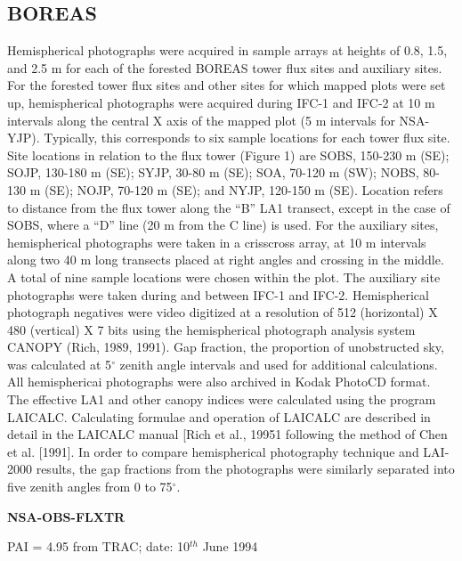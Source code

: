 \documentclass[a4paper,11pt]{report}
\begin{document}
\subsection{BOREAS}
Hemispherical photographs were acquired in sample arrays at heights of 0.8, 1.5, and 2.5 m for each of the forested BOREAS tower flux sites and auxiliary sites. For the forested tower flux sites and other sites for which mapped plots were set up, hemispherical photographs were acquired during IFC-1 and IFC-2 at 10 m intervals along the central X axis of the mapped plot (5 m intervals for NSA-YJP). Typically, this corresponds to six sample locations for each tower flux site. Site locations in relation to the flux tower (Figure 1) are SOBS, 150-230 m (SE); SOJP, 130-180 m (SE); SYJP, 30-80 m (SE); SOA, 70-120 m (SW); NOBS, 80-130 m (SE); NOJP, 70-120 m (SE); and NYJP, 120-150 m (SE). Location refers to distance from the flux tower along the “B” LA1 transect, except in the case of SOBS, where a “D” line (20 m from the C line) is used. For the auxiliary sites, hemispherical photographs were taken in a crisscross array, at 10 m intervals along two 40 m long transects placed at right angles and crossing in
the middle. A total of nine sample locations were chosen within the plot. The auxiliary site photographs were taken during and between IFC-1 and IFC-2.
Hemispherical photograph negatives were video digitized at a resolution of 512 (horizontal) X 480 (vertical) X 7 bits using the hemispherical photograph analysis system CANOPY (Rich, 1989, 1991). Gap fraction, the proportion of unobstructed sky, was calculated at 5$^{\circ}$ zenith angle intervals and used for additional calculations. All hemisphericai photographs were also archived in Kodak PhotoCD format. The effective LA1 and other canopy indices were calculated using the program LAICALC. Calculating formulae and operation of LAICALC are described in detail in the LAICALC manual [Rich et al., 19951 following the method of Chen et al. [1991]. In order to compare hemispherical photography technique and LAI-2000 results, the gap fractions from the photographs were similarly separated into five zenith angles from 0 to 75$^{\circ}$.

\bigskip
\noindent\textbf{NSA-OBS-FLXTR}
\bigskip

PAI = 4.95 from TRAC; date: 10$^{th}$ June 1994
\end{document}
